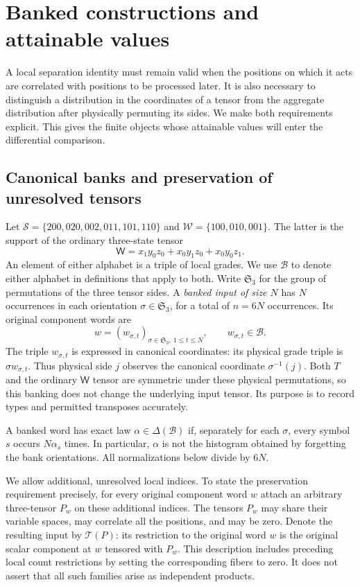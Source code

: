 \section{Banked constructions and attainable values}
\label{val:section}

A local separation identity must remain valid when the positions on which it
acts are correlated with positions to be processed later.  It is also necessary
to distinguish a distribution in the coordinates of a tensor from the
aggregate distribution after physically permuting its sides.  We make both
requirements explicit.  This gives the finite objects whose attainable values
will enter the differential comparison.

\subsection{Canonical banks and preservation of unresolved tensors}
\label{val:banks}

Let $\mathcal S=\{200,020,002,011,101,110\}$ and
$\mathcal W=\{100,010,001\}$.  The latter is the support of the ordinary
three-state tensor
\[
 \mathsf W=x_1y_0z_0+x_0y_1z_0+x_0y_0z_1.
\]
An element of either alphabet is a triple of local grades.
We use $\mathcal B$ to denote either alphabet in definitions
that apply to both.  Write $\mathfrak S_3$ for the group of permutations of the
three tensor sides.  A \emph{banked input of size $N$} has $N$ occurrences in
each orientation $\sigma\in\mathfrak S_3$, for a total of $n=6N$
occurrences.  Its original component words are
\[
 w=(w_{\sigma,t})_{\sigma\in\mathfrak S_3,\ 1\le t\le N},
 \qquad w_{\sigma,t}\in\mathcal B.
\]
The triple $w_{\sigma,t}$ is expressed in canonical coordinates: its physical
grade triple is $\sigma w_{\sigma,t}$.  Thus physical side $j$ observes the
canonical coordinate $\sigma^{-1}(j)$.  Both $T$ and the ordinary $\mathsf W$ tensor
are symmetric under these physical permutations, so this banking does not
change the underlying input tensor.  Its purpose is to record types and
permitted transposes accurately.

A banked word has exact law $\alpha\in\Delta(\mathcal B)$ if, separately for
each $\sigma$, every symbol $s$ occurs $N\alpha_s$ times.  In particular,
$\alpha$ is not the histogram obtained by forgetting the bank orientations.
All normalizations below divide by $6N$.

We allow additional, unresolved local indices.  To state the preservation
requirement precisely, for every original component word $w$ attach an
arbitrary three-tensor $P_w$ on these additional indices.  The tensors $P_w$
may share their variable spaces, may correlate all the positions, and may be
zero.  Denote the resulting input by $\mathcal T(P)$: its restriction to the
original word $w$ is the original scalar component at $w$ tensored with
$P_w$.  This description includes preceding local count restrictions by
setting the corresponding fibers to zero.  It does not assert that all such
families arise as independent products.

